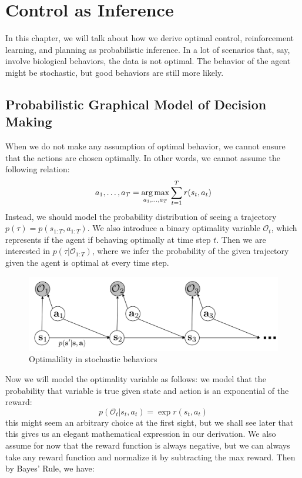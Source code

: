 \chapter{Control as Inference}
In this chapter, we will talk about how we derive optimal control, reinforcement learning, and planning as
probabilistic inference. In a lot of scenarios that, say, involve biological behaviors, the data is not optimal. The behavior of the agent might be stochastic, but good behaviors are still more likely. 

\section{Probabilistic Graphical Model of Decision Making}
When we do not make any assumption of optimal behavior, we cannot ensure that the actions are chosen optimally. In other words, we cannot assume the following relation:
\[
a_1,\dots,a_T = \operatorname*{arg\,max}_{a_1,\dots,a_T}\sum_{t=1}^Tr(s_t,a_t)
\]
Instead, we should model the probability distribution of seeing a trajectory $p(\tau) = p(s_{1:T},a_{1:T})$. We also introduce a binary optimality variable $\mathcal{O}_t$, which represents if the agent if behaving optimally at time step $t$. Then we are interested in $p(\tau|\mathcal{O}_{1:T})$, where we infer the probability of the given trajectory given the agent is optimal at every time step.
\begin{figure}
    \centering
    \includegraphics[scale=0.4]{figures/opt.png}
    \caption{Optimalility in stochastic behaviors}
    \label{fig:opt}
\end{figure}
Now we will model the optimality variable as follows: we model that the probability that variable is true given state and action is an exponential of the reward:
\[
p(\mathcal{O}_t|s_t,a_t) = \exp{r(s_t,a_t)}
\]
this might seem an arbitrary choice at the first sight, but we shall see later that this gives us an elegant mathematical expression in our derivation. We also assume for now that the reward function is always negative, but we can always take any reward function and normalize it by subtracting the max reward. Then by Bayes' Rule, we have:

